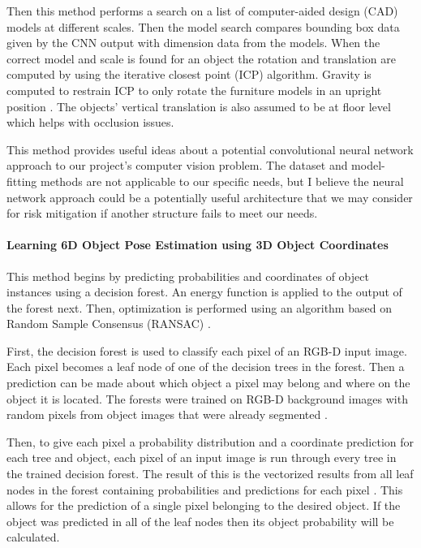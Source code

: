 \documentclass[12pt]{article}
\begin{document}
Then this method performs a search on a list of computer-aided design
(CAD) models at different scales. Then the model search compares
bounding box data given by the CNN output with dimension data from the
models. When the correct model and scale is found for an object the
rotation and translation are computed by using the iterative closest
point (ICP) algorithm. Gravity is computed to restrain ICP to only
rotate the furniture models in an upright position \autocite{gupta}. The
objects' vertical translation is also assumed to be at floor level which
helps with occlusion issues.

This method provides useful ideas about a potential convolutional neural
network approach to our project's computer vision problem. The dataset
and model-fitting methods are not applicable to our specific needs, but
I believe the neural network approach could be a potentially useful
architecture that we may consider for risk mitigation if another
structure fails to meet our needs.

\paragraph{Learning 6D Object Pose Estimation using 3D Object
Coordinates}\label{learning-6d-object-pose-estimation-using-3d-object-coordinates}

This method begins by predicting probabilities and coordinates of object
instances using a decision forest. An energy function is applied to the
output of the forest next. Then, optimization is performed using an
algorithm based on Random Sample Consensus (RANSAC)
\autocite{brachmann2}.

First, the decision forest is used to classify each pixel of an RGB-D
input image. Each pixel becomes a leaf node of one of the decision trees
in the forest. Then a prediction can be made about which object a pixel
may belong and where on the object it is located. The forests were
trained on RGB-D background images with random pixels from object images
that were already segmented \autocite{brachmann2}.

Then, to give each pixel a probability distribution and a coordinate
prediction for each tree and object, each pixel of an input image is run
through every tree in the trained decision forest. The result of this is
the vectorized results from all leaf nodes in the forest containing
probabilities and predictions for each pixel \autocite{brachmann2}. This
allows for the prediction of a single pixel belonging to the desired
object. If the object was predicted in all of the leaf nodes then its
object probability will be calculated.
\end{document}
